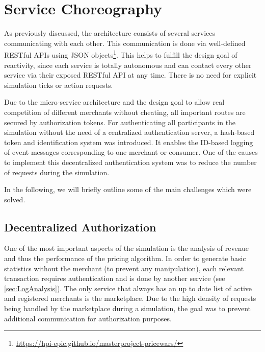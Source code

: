 %
\section{Service Choreography}
\label{sec:Choreography}
%
As previously discussed, the architecture consists of several services communicating with each other. This communication is done via well-defined RESTful APIs using JSON objects\footnote{\url{https://hpi-epic.github.io/masterproject-pricewars/}}. This helps to fulfill the design goal of reactivity, since each service is totally autonomous and can contact every other service via their exposed RESTful API at any time. There is no need for explicit simulation ticks or action requests.

Due to the micro-service architecture and the design goal to allow real competition of different merchants without cheating, all important routes are secured by authorization tokens. For authenticating all participants in the simulation without the need of a centralized authentication server, a hash-based token and identification system was introduced. It enables the ID-based logging of event messages corresponding to one merchant or consumer. One of the causes to implement this decentralized authentication system was to reduce the number of requests during the simulation.


In the following, we will briefly outline some of the main challenges which were solved.

%
\subsection{Decentralized Authorization}
\label{sec:DecentralizedAuthorization}
%
One of the most important aspects of the simulation is the analysis of revenue and thus the performance of the pricing algorithm. In order to generate basic statistics without the merchant (to prevent any manipulation), each relevant transaction requires authentication and is done by another service (see \cref{sec:LogAnalysis}). The only service that always has an up to date list of active and registered merchants is the marketplace. Due to the high density of requests being handled by the marketplace during a simulation, the goal was to prevent additional communication for authorization purposes. 

